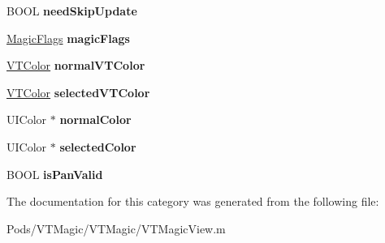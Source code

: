\begin{DoxyCompactItemize}
\mbox{\label{category_v_t_magic_view_07_08_a45939f914d9cfc65ed054a01a672df0f}} 
B\+O\+OL {\bfseries need\+Skip\+Update}
\item 
\mbox{\label{category_v_t_magic_view_07_08_a6894392662ed8ac57f2328d68995ca04}} 
\mbox{\hyperlink{struct_magic_flags}{Magic\+Flags}} {\bfseries magic\+Flags}
\item 
\mbox{\label{category_v_t_magic_view_07_08_afc7a0e8a6851f02661f655afb54daaef}} 
\mbox{\hyperlink{struct_v_t_color}{V\+T\+Color}} {\bfseries normal\+V\+T\+Color}
\item 
\mbox{\label{category_v_t_magic_view_07_08_a12cfe6ec7176d053a9af6595fc46bed7}} 
\mbox{\hyperlink{struct_v_t_color}{V\+T\+Color}} {\bfseries selected\+V\+T\+Color}
\item 
\mbox{\label{category_v_t_magic_view_07_08_a97219a7bdedfe4e23cdb91278c81c555}} 
U\+I\+Color $\ast$ {\bfseries normal\+Color}
\item 
\mbox{\label{category_v_t_magic_view_07_08_aa08ceb614dcfad6d9ee4223078f47f80}} 
U\+I\+Color $\ast$ {\bfseries selected\+Color}
\item 
\mbox{\label{category_v_t_magic_view_07_08_abe52ebedbf92360ba4f7a079e602c0ef}} 
B\+O\+OL {\bfseries is\+Pan\+Valid}
\end{DoxyCompactItemize}


The documentation for this category was generated from the following file\+:\begin{DoxyCompactItemize}
\item 
Pods/\+V\+T\+Magic/\+V\+T\+Magic/V\+T\+Magic\+View.\+m\end{DoxyCompactItemize}
